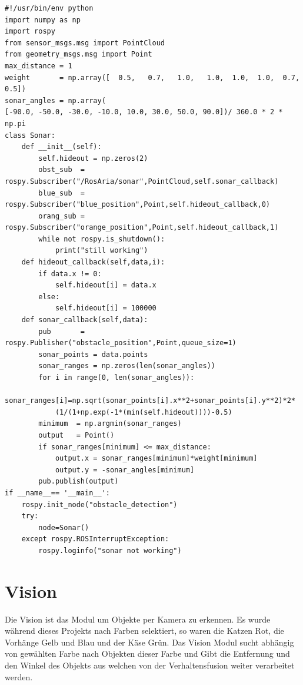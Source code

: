 \documentclass[11pt,a4paper]{article}
\begin{document}
\begin{scriptsize}
\begin{lstlisting} 
#!/usr/bin/env python
import numpy as np
import rospy
from sensor_msgs.msg import PointCloud
from geometry_msgs.msg import Point
max_distance = 1
weight       = np.array([  0.5,   0.7,   1.0,   1.0,  1.0,  1.0,  0.7,  0.5])
sonar_angles = np.array(
[-90.0, -50.0, -30.0, -10.0, 10.0, 30.0, 50.0, 90.0])/ 360.0 * 2 * np.pi
class Sonar:
    def __init__(self):
        self.hideout = np.zeros(2)
        obst_sub  = rospy.Subscriber("/RosAria/sonar",PointCloud,self.sonar_callback)
        blue_sub  = rospy.Subscriber("blue_position",Point,self.hideout_callback,0)
        orang_sub = rospy.Subscriber("orange_position",Point,self.hideout_callback,1)
        while not rospy.is_shutdown():
            print("still working")
    def hideout_callback(self,data,i):
        if data.x != 0:
            self.hideout[i] = data.x
        else:
            self.hideout[i] = 100000
    def sonar_callback(self,data):
        pub       = rospy.Publisher("obstacle_position",Point,queue_size=1)
        sonar_points = data.points
        sonar_ranges = np.zeros(len(sonar_angles))
        for i in range(0, len(sonar_angles)):
            sonar_ranges[i]=np.sqrt(sonar_points[i].x**2+sonar_points[i].y**2)*2*
            (1/(1+np.exp(-1*(min(self.hideout))))-0.5)
        minimum  = np.argmin(sonar_ranges)
        output   = Point()
        if sonar_ranges[minimum] <= max_distance:
            output.x = sonar_ranges[minimum]*weight[minimum]
            output.y = -sonar_angles[minimum]
        pub.publish(output)
if __name__== '__main__':
    rospy.init_node("obstacle_detection")
    try:
        node=Sonar()
    except rospy.ROSInterruptException:
        rospy.loginfo("sonar not working")
\end{lstlisting} 

\end{scriptsize}
\newpage
\section{Vision}      
Die Vision ist das Modul um Objekte per Kamera zu erkennen. Es wurde während dieses Projekts nach Farben selektiert, so waren die Katzen Rot, die Vorhänge Gelb und Blau und der Käse Grün. Das Vision Modul sucht abhängig von gewählten Farbe nach Objekten dieser Farbe und Gibt die Entfernung und den Winkel des Objekts aus welchen von der Verhaltensfusion weiter verarbeitet werden.
\end{document}
